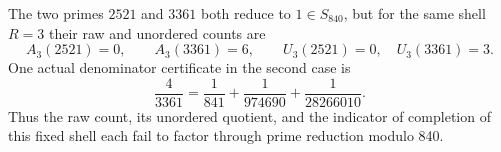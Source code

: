 \begin{theorem}
\label{esn:thm:non-descent}
The two primes \(2521\) and \(3361\) both reduce to \(1\in S_{840}\),
but for the same shell \(R=3\) their raw and unordered counts are
\begin{equation}
 A_3(2521)=0,\qquad A_3(3361)=6,
 \qquad U_3(2521)=0,\quad U_3(3361)=3.
 \label{esn:eq:non-descent-counts}
\end{equation}
One actual denominator certificate in the second case is
\begin{equation}
 \frac4{3361}=\frac1{841}+\frac1{974690}+\frac1{28266010}.
 \label{esn:eq:explicit-denominator-example}
\end{equation}
Thus the raw count, its unordered quotient, and the indicator of
completion of this fixed shell each fail to factor through prime
reduction modulo 840.
\end{theorem}

